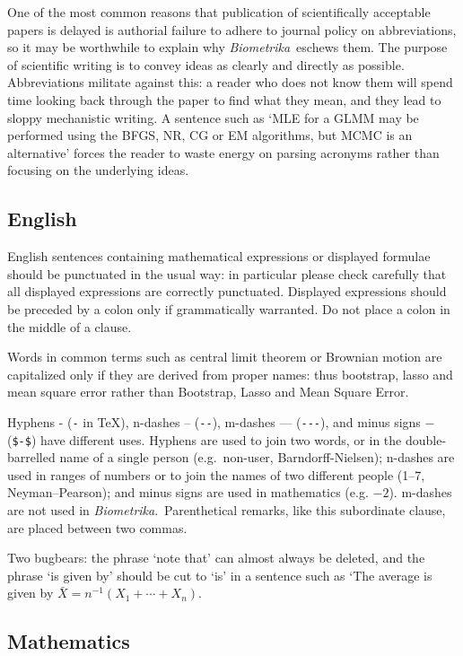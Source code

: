 \documentclass[lineno]{biometrika}
\def\Bka{{\it Biometrika}}
\begin{document}
One of the most common reasons that publication of scientifically acceptable papers is delayed is authorial  failure to adhere to journal policy on abbreviations, so it may be worthwhile to explain why \Bka\ eschews them. The purpose of scientific writing is to convey ideas as clearly and directly as possible.  Abbreviations militate against this: a reader who does not know them will spend time looking back through the paper to find what they mean, and they lead to sloppy mechanistic writing. A sentence such as `MLE for a GLMM may be performed using the BFGS, NR, CG or EM algorithms, but MCMC is an alternative' forces the reader to waste energy on parsing acronyms  rather than focusing on the underlying ideas.

\subsection{English}

English sentences containing mathematical expressions or displayed formulae should be punctuated in the usual way: in particular please check carefully that all displayed expressions are correctly punctuated.  Displayed expressions should be preceded by a colon only if grammatically warranted. Do not place a colon in the middle of a clause.

Words in common terms such as central limit theorem or Brownian motion are capitalized only if they are derived from proper names: thus bootstrap,  lasso and mean square error rather than Bootstrap, Lasso and  Mean Square Error.

Hyphens - (\verb+-+ in \TeX), n-dashes -- (\verb+--+), m-dashes --- (\verb+---+), and minus signs $-$ (\verb+$-$+) have different uses.  Hyphens are used to join two words, or in the double-barrelled name of a single person (e.g.\ non-user, Barndorff-Nielsen); n-dashes are used in ranges of numbers or to join the names of two different people (1--7, Neyman--Pearson); and minus signs are used in mathematics (e.g. $-2$). m-dashes are not used in \Bka.\  Parenthetical remarks, like this subordinate clause, are placed between two commas.

Two bugbears: the phrase `note that' can almost always be deleted, and the phrase `is given by' should be cut to `is' in a sentence such as `The average is given by $\bar X=n^{-1}(X_1+\cdots+X_n)$.

\subsection{Mathematics}
\end{document}
